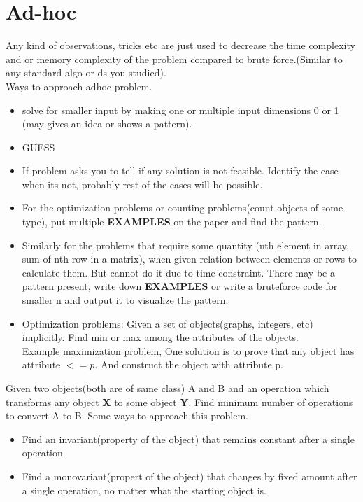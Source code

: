 \documentclass[../Notes.tex]{subfiles}
\begin{document}
\chapter{Ad-hoc}
Any kind of observations, tricks etc are just used to decrease the time complexity and or memory complexity of the problem compared to brute force.(Similar to any standard  algo or ds you studied).\\

Ways to approach adhoc problem.
\begin{itemize}
	\item solve for smaller input by making one or multiple input dimensions 0 or 1 (may gives an idea or shows a pattern).
	\item GUESS
	\item If problem asks you to tell if any solution is not feasible. Identify the case when its not, probably rest of the cases will be possible.

	\item For the optimization problems or counting problems(count objects of some type), put multiple \textbf{EXAMPLES} on the paper and find the pattern.
	\item Similarly for the problems that require some quantity (nth element in array, sum of nth row in a matrix), when given relation between elements or rows to calculate them. But cannot do it due to time constraint. There may be a pattern present, write down \textbf{EXAMPLES} or write a bruteforce code for smaller n and output it to visualize the pattern.
	\item Optimization problems: Given a set of objects(graphs, integers, etc) implicitly. Find min or max among the attributes of the objects.\\ Example maximization problem, One solution is to prove that any object has attribute $<= p$. And construct the object with attribute p.  
\end{itemize}

Given two objects(both are of same class) A and B and an operation which transforms any object \textbf{X} to some object \textbf{Y}. Find minimum number of operations to convert A to B. Some ways to approach this problem.
\begin{itemize}
	\item Find an invariant(property of the object) that remains constant after a single operation.
	\item Find a monovariant(propert of the object) that changes by fixed amount after a single operation, no matter what the starting object is.
\end{itemize}
\end{document}
